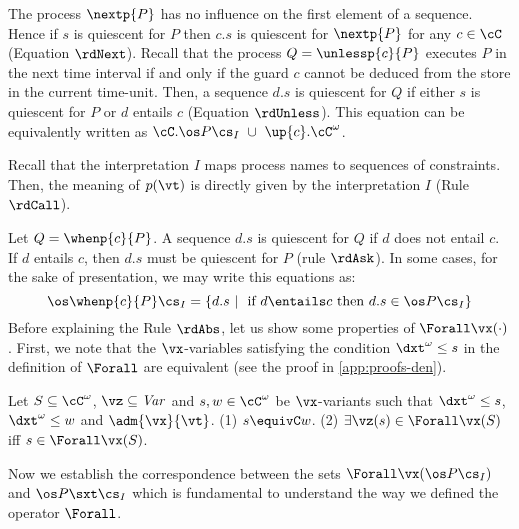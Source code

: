 \documentclass{tlp}
\begin{document}
The process $\nextp{P}$ has no influence on the first 
element of a sequence. Hence if $s$ is quiescent for $P$ then $c.s$ is quiescent for $\nextp{P}$ for any $c\in \cC$   (Equation $\rdNext$). 
Recall that the process $Q=\unlessp{c}{P}$ executes $P$ in the next time interval if and only if the guard $c$ cannot be deduced from the store in the current time-unit. Then, a sequence $d.s$ is quiescent for $Q$  if either  $s$ is quiescent for $P$ or $d$ entails $c$  (Equation $\rdUnless$). This equation can be equivalently written as  $\cC.\os P \cs_I  \ \cup \ \up{c}.\cC^\omega$.

Recall that the interpretation $I$ maps process names to sequences of constraints. Then, the meaning of  $p(\vt)$ is directly given by the interpretation $I$ (Rule $\rdCall$). 


Let $Q=\whenp{c}{P}$. A sequence $d.s$ is quiescent for $Q$ if $d$ does not entail $c$. If $d$ entails $c$, then  $d.s$ must be quiescent for $P$ (rule $\rdAsk$). In some cases, for the sake of presentation, we may write this equations as:
   \[
   \os \whenp{c}{P} \cs_I = \{ d.s \ | \  \mbox{ if } d\entails c \mbox { then } d.s \in \os P \cs_I \} 
   \]
      Before explaining the Rule $\rdAbs$, let us show some properties of $\Forall \vx (\cdot)$. First, we note that the $\vx$-variables satisfying the condition 
   $\dxt^\omega \leq s$ in the definition of $\Forall$ are equivalent (see the proof in \ref{app:proofs-den}). 
   
   \begin{observation}\label{l-vx-eq}
Let $S \subseteq \cC^\omega$, $\vz \subseteq {\it Var}$ and   $s,w \in \cC^\omega$ be $\vx$-variants such that $\dxt^\omega \leq s$,  $\dxt^\omega \leq w$  and $\adm{\vx}{\vt}$. (1)  $s\equivC w$. (2)   $\exists \vz(s) \in \Forall \vx (S)$ iff $s \in \Forall \vx (S)$. 
\end{observation}
      
Now we  establish the correspondence between 
the sets  $\Forall \vx ( \os P \cs_I)$  and  $\os P\sxt \cs_I$ which is fundamental to  understand the way we defined the operator $\Forall$.
\end{document}
